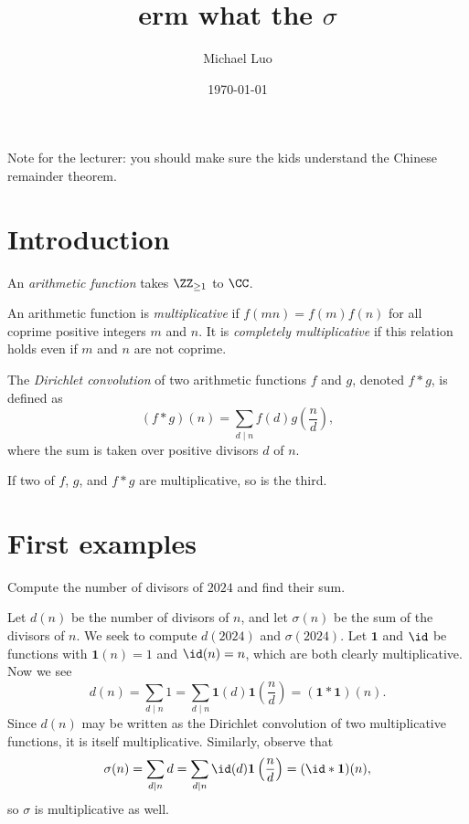 \documentclass[11pt]{scrartcl}
\title{\texorpdfstring{erm what the $\sigma$}{}}
\author{Michael Luo}
\date{\today}
\begin{document}
\maketitle

Note for the lecturer: you should make sure the kids understand the Chinese remainder theorem.

\section{Introduction}

\begin{definition}
    An \emph{arithmetic function} takes $\ZZ_{\ge 1}$ to $\CC$.
\end{definition}

\begin{definition}
    An arithmetic function is \emph{multiplicative} if $f(mn) = f(m)f(n)$ for all coprime positive integers $m$ and $n$. It is \emph{completely multiplicative} if this relation holds even if $m$ and $n$ are not coprime.
\end{definition}

\begin{definition}
    The \emph{Dirichlet convolution} of two arithmetic functions $f$ and $g$, denoted $f \ast g$, is defined as
    \[(f \ast g)(n) = \sum_{d \mid n}f(d)g\left(\frac{n}{d}\right),\]
    where the sum is taken over positive divisors $d$ of $n$.
\end{definition}

\begin{theorem}\label{thm:convolution}
	If two of $f$, $g$, and $f \ast g$ are multiplicative, so is the third.
\end{theorem}

\section{First examples}

\begin{example}
	Compute the number of divisors of $2024$ and find their sum.
\end{example}

Let $d(n)$ be the number of divisors of $n$, and let $\sigma(n)$ be the sum of the divisors of $n$. We seek to compute $d(2024)$ and $\sigma(2024)$. Let $\mathbf 1$ and $\id$ be functions with $\mathbf 1(n) = 1$ and $\id(n) = n$, which are both clearly multiplicative. Now we see
\[d(n) = \sum_{d \mid n}1 = \sum_{d \mid n}\mathbf 1(d)\mathbf 1\left(\frac{n}{d}\right) = (\mathbf 1 \ast \mathbf 1)(n).\]
Since $d(n)$ may be written as the Dirichlet convolution of two multiplicative functions, it is itself multiplicative. Similarly, observe that
\[\sigma(n) = \sum_{d \mid n}d = \sum_{d \mid n}\id(d)\mathbf 1\left(\frac{n}{d}\right) = (\id \ast \mathbf 1)(n),\]
so $\sigma$ is multiplicative as well.
\end{document}
